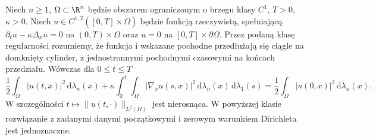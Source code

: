 \begin{twierdzenie}
\label{thm:pde4-energy}
Niech $n\geq1$, $\Omega\subset\R^n$ będzie obszarem
ograniczonym o brzegu klasy $C^1$, $T>0$, $\kappa>0$.
Niech $u\in C^{1,2}([0,T]\times\overline\Omega)$
będzie funkcją rzeczywistą, spełniającą
$\partial_tu-\kappa\Delta_xu=0$ na $(0,T)\times\Omega$
oraz $u=0$ na $[0,T]\times\partial\Omega$.
Przez podaną klasę regularności rozumiemy, że funkcja
i wskazane pochodne przedłużają się ciągle na
domknięty cylinder, z jednostronnymi pochodnymi
czasowymi na końcach przedziału.
Wówczas dla $0\leq t\leq T$
\begin{equation}\label{eq:pde4-energy}
 \frac12\int_\Omega |u(t,x)|^2\,\mathrm d\lambda_n(x)
 +\kappa\int_0^t\!\int_\Omega|\nabla_xu(s,x)|^2
 \,\mathrm d\lambda_n(x)\,\mathrm d\lambda_1(s)
 =\frac12\int_\Omega|u(0,x)|^2\,\mathrm d\lambda_n(x).
\end{equation}
W szczególności $t\mapsto\|u(t,\cdot)\|_{L^2(\Omega)}$
jest nierosnąca. W powyższej klasie rozwiązanie
z zadanymi danymi początkowymi i zerowym warunkiem
Dirichleta jest jednoznaczne.
\end{twierdzenie}
